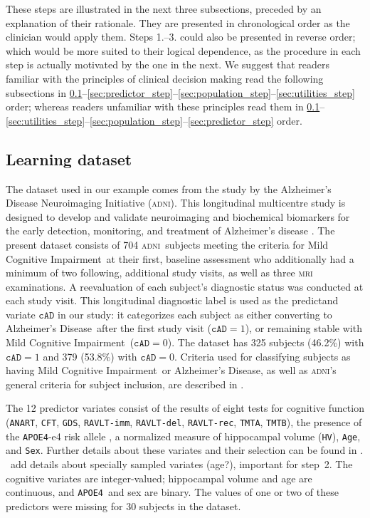 \documentclass[utf8]{FrontiersinHarvard} %
\newcommand*{\wrench}{{\fontencoding{U}\fontfamily{fontawesomethree}\selectfont\symbol{114}}}
\newcommand{\mynotew}[1]{{\color{notecolour}\wrench\ #1}}
\renewcommand*{\|}[1][]{\nonscript\:#1\vert\nonscript\:\mathopen{}}
\newcommand*{\age}{\texttt{Age}}
\newcommand*{\sex}{\texttt{Sex}}
\newcommand*{\apoe}{\texttt{APOE4}}
\newcommand*{\hv}{\texttt{HV}}
\newcommand*{\anart}{\texttt{ANART}}
\newcommand*{\cft}{\texttt{CFT}}
\newcommand*{\gds}{\texttt{GDS}}
\newcommand*{\ravltimm}{\texttt{RAVLT-imm}}
\newcommand*{\ravltdel}{\texttt{RAVLT-del}}
\newcommand*{\ravltrec}{\texttt{RAVLT-rec}}
\newcommand*{\tmta}{\texttt{TMTA}}
\newcommand*{\tmtb}{\texttt{TMTB}}
\newcommand*{\cad}{\texttt{cAD}}
\newcommand*{\ad}{Alzheimer's Disease}
\newcommand*{\mci}{Mild Cognitive Impairment}
\newcommand*{\adni}{\textsc{adni}}
\begin{document}
These steps are illustrated in the next three subsections, preceded by an explanation of their rationale. They are presented in chronological order as the clinician would apply them. %
Steps 1.--3. could also be presented in reverse order; which would be more suited to their logical dependence, as the procedure in each step is actually motivated by the one in the next. We suggest that readers familiar with the principles of clinical decision making read the following subsections in \ref{sec:dataset}--\ref{sec:predictor_step}--\ref{sec:population_step}--\ref{sec:utilities_step} order; whereas readers unfamiliar with these principles read them in \ref{sec:dataset}--\ref{sec:utilities_step}--\ref{sec:population_step}--\ref{sec:predictor_step} order.


\setcounter{subsection}{-1}
\subsection{Learning dataset}
\label{sec:dataset}

The dataset used in our example comes from the study by the Alzheimer's Disease Neuroimaging Initiative (\adni). This longitudinal multicentre study is designed to develop and validate neuroimaging and biochemical biomarkers for the early detection, monitoring, and treatment of Alzheimer's disease \citep{petersenetal2010}. The present dataset consists of 704 \adni\ subjects meeting the criteria for \mci\ at their first, baseline assessment who additionally had a minimum of two following, additional study visits, as well as three \textsc{mri} examinations. A reevaluation of each subject's diagnostic status was conducted at each study visit. This longitudinal diagnostic label is used as the predictand variate $\cad$ in our study: it categorizes each subject as either converting to \ad\ after the first study visit ($\cad=1$), or remaining stable with \mci\ ($\cad=0$). The dataset has 325 subjects (46.2\%) with $\cad=1$ and 379 (53.8\%) with $\cad=0$. Criteria used for classifying subjects as having \mci\ or \ad, as well as \adni's general criteria for subject inclusion, are described in \citet{mckhannetal1984,petersenetal2010}.

The 12 predictor variates consist of the results of eight tests for cognitive function (\anart, \cft, \gds, \ravltimm, \ravltdel, \ravltrec, \tmta, \tmtb), the presence of the \apoe-e4 risk allele \citep{liuetal2013}, a normalized measure of hippocampal volume (\hv), \age, and \sex. Further details about these variates and their selection can be found in \citet{ryeetal2022}. \mynotew{add details about specially sampled variates (age?), important for step~2.} The cognitive variates are integer-valued; hippocampal volume and age are continuous, and \apoe\ and sex are binary. The values of one or two of these predictors were missing for 30 subjects in the dataset.
\end{document}
